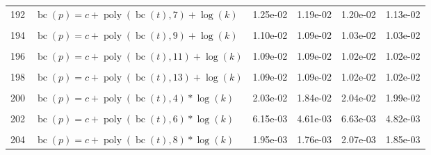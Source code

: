 \documentclass[12pt,a4paper]{article}
\DeclareMathOperator{\bc}{bc}
\DeclareMathOperator{\poly}{poly}
\begin{document}
\begin{longtable}[t]{ll>{\raggedleft\arraybackslash}p{2cm}>{\raggedleft\arraybackslash}p{2cm}>{\raggedleft\arraybackslash}p{2cm}>{\raggedleft\arraybackslash}p{2cm}}
192 & $\bc(p) = c + \poly\left( \bc(t), 7 \right) + \log(k)$ & 1.25e-02 & 1.19e-02 & 1.20e-02 & 1.13e-02\\
\cellcolor{gray!6}{193} & \cellcolor{gray!6}{$\bc(p) = c + \poly\left( \bc(t), 8 \right) + \log(k)$} & \cellcolor{gray!6}{1.10e-02} & \cellcolor{gray!6}{1.10e-02} & \cellcolor{gray!6}{1.04e-02} & \cellcolor{gray!6}{1.03e-02}\\
194 & $\bc(p) = c + \poly\left( \bc(t), 9 \right) + \log(k)$ & 1.10e-02 & 1.09e-02 & 1.03e-02 & 1.03e-02\\
\cellcolor{gray!6}{195} & \cellcolor{gray!6}{$\bc(p) = c + \poly\left( \bc(t), 10 \right) + \log(k)$} & \cellcolor{gray!6}{1.09e-02} & \cellcolor{gray!6}{1.09e-02} & \cellcolor{gray!6}{1.02e-02} & \cellcolor{gray!6}{1.02e-02}\\
196 & $\bc(p) = c + \poly\left( \bc(t), 11 \right) + \log(k)$ & 1.09e-02 & 1.09e-02 & 1.02e-02 & 1.02e-02\\
\cellcolor{gray!6}{197} & \cellcolor{gray!6}{$\bc(p) = c + \poly\left( \bc(t), 12 \right) + \log(k)$} & \cellcolor{gray!6}{1.09e-02} & \cellcolor{gray!6}{1.09e-02} & \cellcolor{gray!6}{1.02e-02} & \cellcolor{gray!6}{1.02e-02}\\
198 & $\bc(p) = c + \poly\left( \bc(t), 13 \right) + \log(k)$ & 1.09e-02 & 1.09e-02 & 1.02e-02 & 1.02e-02\\
\cellcolor{gray!6}{199} & \cellcolor{gray!6}{$\bc(p) = c + \poly\left( \bc(t), 3 \right) * \log(k)$} & \cellcolor{gray!6}{3.67e-02} & \cellcolor{gray!6}{1.51e-02} & \cellcolor{gray!6}{1.66e-02} & \cellcolor{gray!6}{1.59e-02}\\
200 & $\bc(p) = c + \poly\left( \bc(t), 4 \right) * \log(k)$ & 2.03e-02 & 1.84e-02 & 2.04e-02 & 1.99e-02\\
\cellcolor{gray!6}{201} & \cellcolor{gray!6}{$\bc(p) = c + \poly\left( \bc(t), 5 \right) * \log(k)$} & \cellcolor{gray!6}{6.30e-03} & \cellcolor{gray!6}{6.22e-03} & \cellcolor{gray!6}{6.13e-03} & \cellcolor{gray!6}{6.04e-03}\\
202 & $\bc(p) = c + \poly\left( \bc(t), 6 \right) * \log(k)$ & 6.15e-03 & 4.61e-03 & 6.63e-03 & 4.82e-03\\
\cellcolor{gray!6}{203} & \cellcolor{gray!6}{$\bc(p) = c + \poly\left( \bc(t), 7 \right) * \log(k)$} & \cellcolor{gray!6}{2.93e-03} & \cellcolor{gray!6}{2.14e-03} & \cellcolor{gray!6}{2.31e-03} & \cellcolor{gray!6}{2.06e-03}\\
204 & $\bc(p) = c + \poly\left( \bc(t), 8 \right) * \log(k)$ & 1.95e-03 & 1.76e-03 & 2.07e-03 & 1.85e-03\\

\end{longtable}
\end{document}
